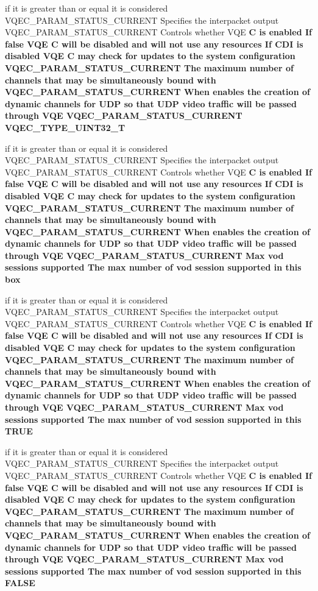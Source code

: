 \begin{CompactItemize}
\item 
if it is greater than or equal it is considered VQEC\_\-PARAM\_\-STATUS\_\-CURRENT Specifies the interpacket output VQEC\_\-PARAM\_\-STATUS\_\-CURRENT Controls whether VQE \bf{C} is enabled If false VQE \bf{C} will be disabled and will not use any resources If CDI is disabled VQE \bf{C} may check for updates \bf{to} the system configuration VQEC\_\-PARAM\_\-STATUS\_\-CURRENT The maximum number of \bf{channels} that may be simultaneously bound with VQEC\_\-PARAM\_\-STATUS\_\-CURRENT When enables the creation of dynamic \bf{channels} for UDP so that UDP video traffic will be passed through VQE VQEC\_\-PARAM\_\-STATUS\_\-CURRENT \bf{VQEC\_\-TYPE\_\-UINT32\_\-T}
\item 
if it is greater than or equal it is considered VQEC\_\-PARAM\_\-STATUS\_\-CURRENT Specifies the interpacket output VQEC\_\-PARAM\_\-STATUS\_\-CURRENT Controls whether VQE \bf{C} is enabled If false VQE \bf{C} will be disabled and will not use any resources If CDI is disabled VQE \bf{C} may check for updates \bf{to} the system configuration VQEC\_\-PARAM\_\-STATUS\_\-CURRENT The maximum number of \bf{channels} that may be simultaneously bound with VQEC\_\-PARAM\_\-STATUS\_\-CURRENT When enables the creation of dynamic \bf{channels} for UDP so that UDP video traffic will be passed through VQE VQEC\_\-PARAM\_\-STATUS\_\-CURRENT Max vod sessions supported The max number of vod session supported in \bf{this} \bf{box}
\item 
if it is greater than or equal it is considered VQEC\_\-PARAM\_\-STATUS\_\-CURRENT Specifies the interpacket output VQEC\_\-PARAM\_\-STATUS\_\-CURRENT Controls whether VQE \bf{C} is enabled If false VQE \bf{C} will be disabled and will not use any resources If CDI is disabled VQE \bf{C} may check for updates \bf{to} the system configuration VQEC\_\-PARAM\_\-STATUS\_\-CURRENT The maximum number of \bf{channels} that may be simultaneously bound with VQEC\_\-PARAM\_\-STATUS\_\-CURRENT When enables the creation of dynamic \bf{channels} for UDP so that UDP video traffic will be passed through VQE VQEC\_\-PARAM\_\-STATUS\_\-CURRENT Max vod sessions supported The max number of vod session supported in \bf{this} \bf{TRUE}
\item 
if it is greater than or equal it is considered VQEC\_\-PARAM\_\-STATUS\_\-CURRENT Specifies the interpacket output VQEC\_\-PARAM\_\-STATUS\_\-CURRENT Controls whether VQE \bf{C} is enabled If false VQE \bf{C} will be disabled and will not use any resources If CDI is disabled VQE \bf{C} may check for updates \bf{to} the system configuration VQEC\_\-PARAM\_\-STATUS\_\-CURRENT The maximum number of \bf{channels} that may be simultaneously bound with VQEC\_\-PARAM\_\-STATUS\_\-CURRENT When enables the creation of dynamic \bf{channels} for UDP so that UDP video traffic will be passed through VQE VQEC\_\-PARAM\_\-STATUS\_\-CURRENT Max vod sessions supported The max number of vod session supported in \bf{this} \bf{FALSE}

\end{CompactItemize}
